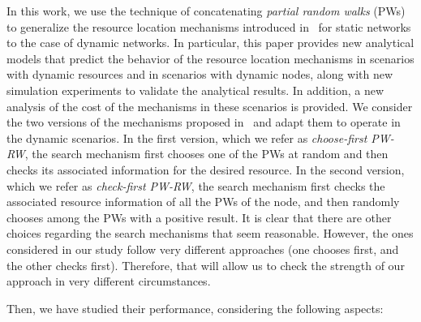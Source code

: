\documentclass[]{elsarticle}
\begin{document}
In this work, we use the technique of concatenating \emph{partial random walks} (PWs) to generalize the resource location mechanisms introduced in~\cite{Lopez:Computing} for static networks to the case of dynamic networks. 
In particular, this paper provides new analytical models that predict the behavior of the resource location mechanisms in scenarios with dynamic resources and in scenarios with dynamic nodes, along with new simulation experiments to validate the analytical results. In addition, a new analysis of the cost of the mechanisms in these scenarios is provided.
We consider the two versions of the mechanisms proposed in~\cite{Lopez:Computing} and adapt them to operate in the dynamic scenarios. 
In the first version, which we refer as \emph{choose-first PW-RW}, the search mechanism first chooses one of the PWs at random and then checks its associated information for the desired resource. In the second version, which we refer as \emph{check-first PW-RW}, the search mechanism first checks the associated resource information of all the PWs of the node, and then randomly chooses among the PWs with a positive result. It is clear that there are other choices regarding the search mechanisms that seem reasonable. However, the ones considered in our study follow very different approaches (one chooses first, and the other checks first). Therefore, that will allow us to check the strength of our approach in very different circumstances.

Then, we have studied their performance, considering the following aspects:
\end{document}
